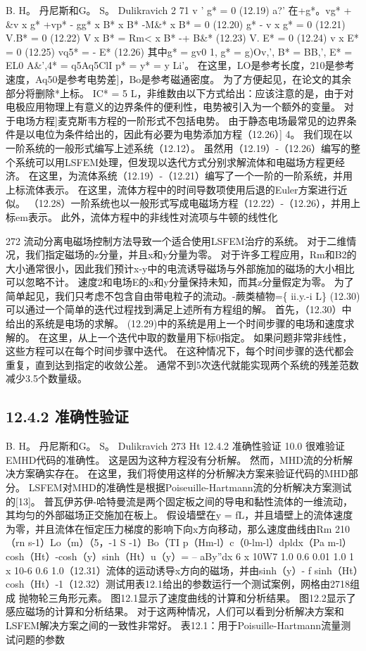 \documentclass[UTF8,11pt,a4paper,openany,fontset=fandol]{ctexbook}
\begin{document}
B. H。 丹尼斯和G。 S。 Dulikravich 2 71 v ' g* = 0 (12.19) a?' 在+g*。vg* + \&v x g* +vp* - gg* x B* x B* -M\&* x B* = 0 (12.20) g* - v x g* = 0 (12.21) V.B* = 0 (12.22) V x B* = Rm< x B* -+ B\&* (12.23) V. E* = 0 (12.24) v x E* = 0 (12.25) vq5* = - E* (12.26) 其中g* = gv0 1, g* = g)Ov,', B* = BB,', E* = EL0 A\&',4* = q5Aq5ClI p* = y* = y Li'。 在这里，LO是参考长度，210是参考速度，Aq50是参考电势差]，Bo是参考磁通密度。 为了方便起见，在论文的其余部分将删除*上标。 IC* = 5 L，非维数由以下方式给出：应该注意的是，由于对电极应用物理上有意义的边界条件的便利性，电势被引入为一个额外的变量。 对于电场方程]麦克斯韦方程的一阶形式不包括电势。 由于静态电场最常见的边界条件是以电位为条件给出的，因此有必要为电势添加方程（12.26）] 4。 我们现在以一阶系统的一般形式编写上述系统（12.12）。 虽然用（12.19）-（12.26）编写的整个系统可以用LSFEM处理，但发现以迭代方式分别求解流体和电磁场方程更经济。 在这里，为流体系统（12.19）-（12.21）编写了一个一阶的一阶系统，并用上标流体表示。 在这里，流体方程中的时间导数项使用后退的Euler方案进行近似。 （12.28）一阶系统也以一般形式写成电磁场方程（12.22）-（12.26），并用上标em表示。 此外，流体方程中的非线性对流项与牛顿的线性化

272 流动分离电磁场控制方法导致一个适合使用LSFEM治疗的系统。 对于二维情况，我们指定磁场的z分量，并且x和y分量为零。 对于许多工程应用，Rm和B2的大小通常很小，因此我们预计x-y中的电流诱导磁场与外部施加的磁场的大小相比可以忽略不计。 速度2和电场E的x和y分量保持未知，而其z分量假定为零。 为了简单起见，我们只考虑不包含自由带电粒子的流动。-蕨类植物=\{ ii.y.-i L\} (12.30) 可以通过一个简单的迭代过程找到满足上述所有方程组的解。 首先，（12.30）中给出的系统是电场的求解。 (12.29)中的系统是用上一个时间步骤的电场和速度求解的。 在这里，从上一个迭代中取的数量用下标0指定。 如果问题非常非线性，这些方程可以在每个时间步骤中迭代。 在这种情况下，每个时间步骤的迭代都会重复，直到达到指定的收敛公差。 通常不到5次迭代就能实现两个系统的残差范数减少3.5个数量级。

\subsection{12.4.2 准确性验证}
B. H。 丹尼斯和G。 S。 Dulikravich 273 Ht 12.4.2 准确性验证 10.0 很难验证EMHD代码的准确性。 这是因为这种方程没有分析解。 然而，MHD流的分析解决方案确实存在。 在这里，我们将使用这样的分析解决方案来验证代码的MHD部分。 LSFEM对MHD的准确性是根据Poiseuille-Hartmann流的分析解决方案测试的[13]。 普瓦伊苏伊-哈特曼流是两个固定板之间的导电和黏性流体的一维流动，其均匀的外部磁场正交施加在板上。 假设墙壁在y = fL，并且墙壁上的流体速度为零，并且流体在恒定压力梯度的影响下向x方向移动，那么速度曲线由Rm 210（rn s-1）Lo（m）（5，-1 S -1）Bo（TI p（Hm-l）c（0-lm-l）dpldx（Pa m-l）cosh（Ht）-cosh（y）sinh（Ht）u（y）= -- aBy”dx 6 x 10W7 1.0 0.6 0.01 1.0 1 x 10-6 0.6 1.0（12.31）流体的运动诱导x方向的磁场，并由sinh（y）- f sinh（Ht）cosh（Ht）-1（12.32）测试用表12.1给出的参数运行一个测试案例，网格由2718组成 抛物轮三角形元素。 图12.1显示了速度曲线的计算和分析结果。 图12.2显示了感应磁场的计算和分析结果。 对于这两种情况，人们可以看到分析解决方案和LSFEM解决方案之间的一致性非常好。 表12.1：用于Poisuille-Hartmann流量测试问题的参数
\end{document}
